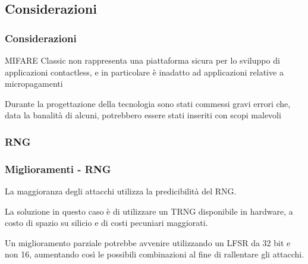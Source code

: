 \subsection{Considerazioni}
\begin{frame}
    \frametitle{Considerazioni}
    MIFARE Classic non rappresenta una piattaforma sicura per lo sviluppo di applicazioni contactless, e in
    particolare è inadatto ad applicazioni relative a micropagamenti\pause

    Durante la progettazione della tecnologia sono stati commessi gravi errori che, data la banalità di alcuni,
    potrebbero essere stati inseriti con scopi malevoli~\cite{Courtois2009TheDS}
\end{frame}

\subsubsection{RNG}
\begin{frame}
    \frametitle{Miglioramenti - RNG}
    La maggioranza degli attacchi utilizza la predicibilità del RNG. \pause
    
    La soluzione in questo caso è di utilizzare un TRNG disponibile in hardware, a costo di spazio su silicio e di costi pecuniari maggiorati.\pause

    Un miglioramento parziale potrebbe avvenire utilizzando un LFSR da 32 bit e non 16, aumentando così le possibili combinazioni al fine di rallentare gli attacchi.
\end{frame}

